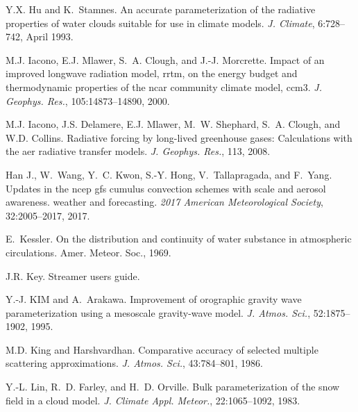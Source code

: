 \begin{DoxyDescription}
\item[\label{_CITEREF_hu_and_stamnes_1993}%
\mbox{[}31\mbox{]}]Y.\+X. Hu and K.~Stamnes. An accurate parameterization of the radiative properties of water clouds suitable for use in climate models. {\itshape J. Climate}, 6\+:728--742, April 1993.


\item[\label{_CITEREF_iacono_et_al_2000}%
\mbox{[}32\mbox{]}]M.\+J. Iacono, E.\+J. Mlawer, S.~A. Clough, and J.-\/J. Morcrette. Impact of an improved longwave radiation model, rrtm, on the energy budget and thermodynamic properties of the ncar community climate model, ccm3. {\itshape J. Geophys. Res.}, 105\+:14873--14890, 2000.


\item[\label{_CITEREF_iacono_et_al_2008}%
\mbox{[}33\mbox{]}]M.\+J. Iacono, J.\+S. Delamere, E.\+J. Mlawer, M.~W. Shephard, S.~A. Clough, and W.\+D. Collins. Radiative forcing by long-\/lived greenhouse gases\+: Calculations with the aer radiative transfer models. {\itshape J. Geophys. Res.}, 113, 2008.


\item[\label{_CITEREF_han_et_al_2017}%
\mbox{[}34\mbox{]}]Han J., W.~Wang, Y.~C. Kwon, S.-\/Y. Hong, V.~Tallapragada, and F.~Yang. Updates in the ncep gfs cumulus convection schemes with scale and aerosol awareness. weather and forecasting. {\itshape 2017 American Meteorological Society}, 32\+:2005--2017, 2017.


\item[\label{_CITEREF_kessler_1969}%
\mbox{[}35\mbox{]}]E.~Kessler. On the distribution and continuity of water substance in atmospheric circulations. Amer. Meteor. Soc., 1969.


\item[\label{_CITEREF_key_2002}%
\mbox{[}36\mbox{]}]J.\+R. Key. Streamer user\textquotesingle{}s guide.


\item[\label{_CITEREF_kim_and_arakawa_1995}%
\mbox{[}37\mbox{]}]Y.-\/J. K\+IM and A.~Arakawa. Improvement of orographic gravity wave parameterization using a mesoscale gravity-\/wave model. {\itshape J. Atmos. Sci.}, 52\+:1875--1902, 1995.


\item[\label{_CITEREF_king_and_harshvardhan_1986}%
\mbox{[}38\mbox{]}]M.\+D. King and Harshvardhan. Comparative accuracy of selected multiple scattering approximations. {\itshape J. Atmos. Sci.}, 43\+:784--801, 1986.


\item[\label{_CITEREF_lin_et_al_1983}%
\mbox{[}39\mbox{]}]Y.-\/L. Lin, R.~D. Farley, and H.~D. Orville. Bulk parameterization of the snow field in a cloud model. {\itshape J. Climate Appl. Meteor.}, 22\+:1065--1092, 1983.



\end{DoxyDescription}
